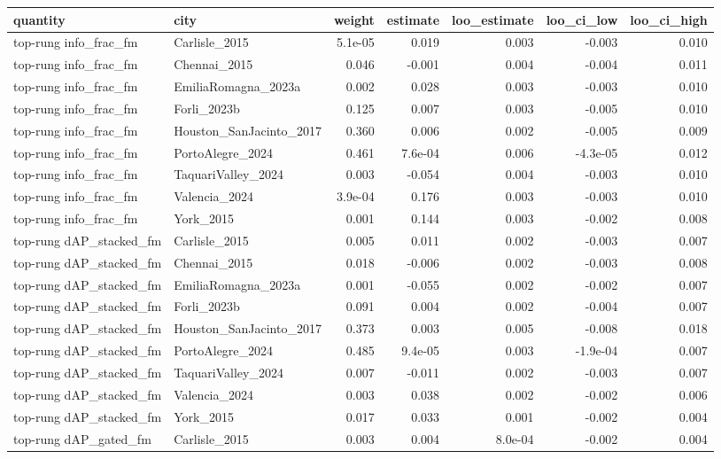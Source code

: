 \begin{tabular}{llrrrrr}
\toprule
quantity & city & weight & estimate & loo_estimate & loo_ci_low & loo_ci_high \\
\midrule
top-rung info\_frac\_fm & Carlisle\_2015 & 5.1e-05 & 0.019 & 0.003 & -0.003 & 0.010 \\
top-rung info\_frac\_fm & Chennai\_2015 & 0.046 & -0.001 & 0.004 & -0.004 & 0.011 \\
top-rung info\_frac\_fm & EmiliaRomagna\_2023a & 0.002 & 0.028 & 0.003 & -0.003 & 0.010 \\
top-rung info\_frac\_fm & Forli\_2023b & 0.125 & 0.007 & 0.003 & -0.005 & 0.010 \\
top-rung info\_frac\_fm & Houston\_SanJacinto\_2017 & 0.360 & 0.006 & 0.002 & -0.005 & 0.009 \\
top-rung info\_frac\_fm & PortoAlegre\_2024 & 0.461 & 7.6e-04 & 0.006 & -4.3e-05 & 0.012 \\
top-rung info\_frac\_fm & TaquariValley\_2024 & 0.003 & -0.054 & 0.004 & -0.003 & 0.010 \\
top-rung info\_frac\_fm & Valencia\_2024 & 3.9e-04 & 0.176 & 0.003 & -0.003 & 0.010 \\
top-rung info\_frac\_fm & York\_2015 & 0.001 & 0.144 & 0.003 & -0.002 & 0.008 \\
top-rung dAP\_stacked\_fm & Carlisle\_2015 & 0.005 & 0.011 & 0.002 & -0.003 & 0.007 \\
top-rung dAP\_stacked\_fm & Chennai\_2015 & 0.018 & -0.006 & 0.002 & -0.003 & 0.008 \\
top-rung dAP\_stacked\_fm & EmiliaRomagna\_2023a & 0.001 & -0.055 & 0.002 & -0.002 & 0.007 \\
top-rung dAP\_stacked\_fm & Forli\_2023b & 0.091 & 0.004 & 0.002 & -0.004 & 0.007 \\
top-rung dAP\_stacked\_fm & Houston\_SanJacinto\_2017 & 0.373 & 0.003 & 0.005 & -0.008 & 0.018 \\
top-rung dAP\_stacked\_fm & PortoAlegre\_2024 & 0.485 & 9.4e-05 & 0.003 & -1.9e-04 & 0.007 \\
top-rung dAP\_stacked\_fm & TaquariValley\_2024 & 0.007 & -0.011 & 0.002 & -0.003 & 0.007 \\
top-rung dAP\_stacked\_fm & Valencia\_2024 & 0.003 & 0.038 & 0.002 & -0.002 & 0.006 \\
top-rung dAP\_stacked\_fm & York\_2015 & 0.017 & 0.033 & 0.001 & -0.002 & 0.004 \\
top-rung dAP\_gated\_fm & Carlisle\_2015 & 0.003 & 0.004 & 8.0e-04 & -0.002 & 0.004 \\

\end{tabular}
